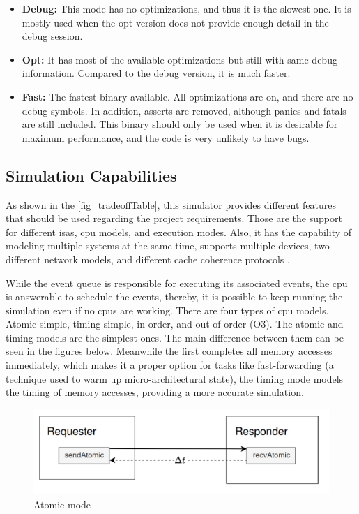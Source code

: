 \begin{itemize}
    \item \textbf{Debug:} This mode has no optimizations, and thus it is the slowest one. It is mostly used when the opt version does not 
	provide enough detail in the debug session. 

    \item \textbf{Opt:} It has most of the available optimizations but still with same debug information. Compared to the debug version, it 
	is much faster.

    \item \textbf{Fast:} The fastest binary available. All optimizations are on, and there are no debug symbols. In addition, asserts are 
	removed, although panics and fatals are still included. This binary should only be used when it is desirable for maximum performance, and 
	the code is very unlikely to have bugs.
\end{itemize}

\subsection{Simulation Capabilities}
\label{subsec::SimCap}

As shown in the \autoref{fig_tradeoffTable}, this simulator provides different features that should be used regarding the project requirements. 
Those are the support for different \glspl{isa}, \gls{cpu} models, and execution modes. Also, it has the capability of modeling multiple systems 
at the same time, supports multiple devices, two different network models, and different cache coherence protocols \cite{TheGem5Simulator}.

While the event queue is responsible for executing its associated events, the \gls{cpu} is answerable to schedule the events, thereby, it is 
possible to keep running the simulation even if no \glspl{cpu} are working. There are four types of \gls{cpu} models. Atomic simple, timing 
simple, in-order, and out-of-order (O3). The atomic and timing models are the simplest ones. The main difference between them can be seen in 
the figures below. Meanwhile the first completes all memory accesses immediately, which makes it a proper option for tasks like 
fast-forwarding (a technique used to warm up micro-architectural state), the timing mode models the timing of memory accesses, providing a more 
accurate simulation.

\begin{figure}[H]
	\centering
 	\includegraphics[width=0.7\linewidth]{Images/AtomicMode.png}
 	\caption{Atomic mode}
	 \label{fig_AtomicMode}
\end{figure}

